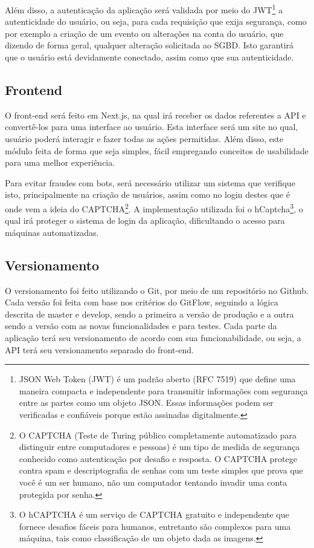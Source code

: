 Além disso, a autenticação da aplicação será validada por meio do JWT\footnote{JSON Web Token (JWT) é um padrão aberto (RFC 7519) que define uma maneira compacta e independente para transmitir informações com segurança entre as partes como um objeto JSON. Essas informações podem ser verificadas e confiáveis porque estão assinadas digitalmente.} a autenticidade do usuário, ou seja, para cada requisição que exija segurança, como por exemplo a criação de um evento ou alterações na conta do usuário, que dizendo de forma geral, qualquer alteração solicitada ao SGBD. Isto garantirá que o usuário está devidamente conectado, assim como que sua autenticidade.

\subsection{Frontend}
O front-end será feito em Next.js, na qual irá receber os dados referentes a API e convertê-los para uma interface ao usuário. Esta interface será um site no qual, usuário poderá interagir e fazer todas as ações permitidas. Além disso, este módulo feita de forma que seja simples, fácil empregando conceitos de usabilidade para uma melhor experiência.

Para evitar fraudes com bots, será necessário utilizar um sistema que verifique isto, principalmente na criação de usuários, assim como no login destes que é onde vem a ideia do CAPTCHA\footnote{O CAPTCHA (Teste de Turing público completamente automatizado para distinguir entre computadores e pessoas) é um tipo de medida de segurança conhecido como autenticação por desafio e resposta. O CAPTCHA protege contra spam e descriptografia de senhas com um teste simples que prova que você é um ser humano, não um computador tentando invadir uma conta protegida por senha.}. A implementação utilizada foi o hCaptcha\footnote{O hCAPTCHA é um serviço de CAPTCHA gratuito e independente que fornece desafios fáceis para humanos, entretanto são complexos para uma máquina, tais como classificação de um objeto dada as imagens.}, o qual irá proteger o sistema de login da aplicação, dificultando o acesso para máquinas automatizadas.

\subsection{Versionamento}
O versionamento foi feito utilizando o Git, por meio de um repositório no Github. Cada versão foi feita com base nos critérios do GitFlow, seguindo a lógica descrita de master e develop, sendo a primeira a versão de produção e a outra sendo a versão com as novas funcionalidades e para testes. Cada parte da aplicação terá seu versionamento de acordo com sua funcionabilidade, ou seja, a API terá seu versionamento separado do front-end.

